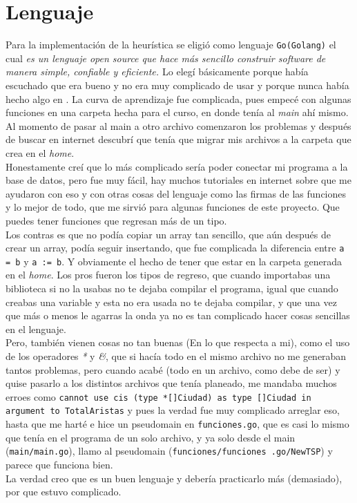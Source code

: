 \documentclass[
10pt,
a4paper,
oneside,
headinclude,footinclude,
BCOR5mm,
]{article}
\begin{document}
\section{Lenguaje}

Para la implementación de la heurística se eligió como lenguaje
\texttt{Go(Golang)} el cual \textit{es un lenguaje open source que hace más
  sencillo construir software de manera simple, confiable y eficiente.
  \cite{Golang01}} Lo elegí básicamente porque había escuchado que era bueno y
no era muy complicado de usar y porque nunca había hecho algo en \GO. La
curva de aprendizaje fue complicada, pues empecé con algunas funciones en una
carpeta hecha para el curso, en donde tenía al \textit{main} ahí mismo. Al
momento de pasar al main a otro archivo comenzaron los problemas y después de
buscar en internet descubrí que tenía que migrar mis archivos a la carpeta que
\GO crea en el \textit{home}.\\
Honestamente creí que lo más complicado sería poder conectar mi programa a la
base de datos, pero fue muy fácil, hay muchos tutoriales en internet sobre
\GO que me ayudaron con eso y con otras cosas del lenguaje como las firmas de las
funciones y lo mejor de todo, que me sirvió para algunas funciones de este
proyecto. Que puedes tener funciones que regresan más de un tipo.\\
Los contras es que no podía copiar un array tan sencillo, que aún después de
crear un array, podía seguir insertando, que fue complicada la diferencia entre
\texttt{a = b} y \texttt{a := b}. Y obviamente el hecho de tener que estar en la
carpeta generada en el \textit{home}.
Los pros fueron los tipos de regreso, que cuando importabas una biblioteca si no
la usabas no te dejaba compilar el programa, igual que cuando creabas una
variable y esta no era usada no te dejaba compilar, y que una vez que más o menos
le agarras la onda ya no es tan complicado hacer cosas sencillas en el lenguaje.\\
Pero, también vienen cosas no tan buenas (En lo que respecta a mi), como el uso
de los operadores \textit{*} y \textit{\&}, que si hacía todo en el mismo archivo
no me generaban tantos problemas, pero cuando acabé (todo en un archivo, como
debe de ser) y quise pasarlo a los distintos archivos que tenía planeado, me
mandaba muchos erroes como \texttt{cannot use cis (type *[]Ciudad) as type
  []Ciudad in argument to TotalAristas} y pues la verdad fue muy complicado
arreglar eso, hasta que me harté e hice un pseudomain en \texttt{funciones.go},
que es casi lo mismo que tenía en el programa de un solo archivo, y ya solo desde
el main (\texttt{main/main.go}), llamo al pseudomain (\texttt{funciones/funciones
  .go/NewTSP}) y parece que funciona bien.\\
La verdad creo que es un buen lenguaje y debería practicarlo más (demasiado), por
que estuvo complicado.
\end{document}
